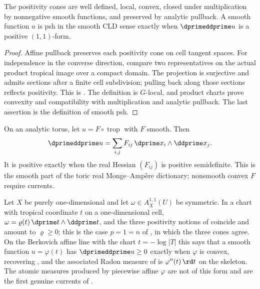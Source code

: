 \begin{proposition}
\label{prop:ch13-positivity-basic}
The positivity cones are well defined, local, convex, closed under
multiplication by nonnegative smooth functions, and preserved by analytic
pullback.  A smooth function $u$ is psh in the smooth CLD sense exactly when
$\dprimeddprime u$ is a positive $(1,1)$-form.
\end{proposition}
\begin{proof}
Affine pullback preserves each positivity cone on cell tangent spaces.
For independence in the converse direction, compare two representatives
on the actual product tropical image over a compact domain.  The
projection is surjective and admits sections after a finite cell
subdivision; pulling back along those sections reflects positivity.
This is \cite[Lemma~3.5.3]{CLD25}.  The definition is $G$-local,
and product charts prove convexity and compatibility with multiplication
and analytic pullback.  The last assertion is the definition of smooth psh.
\end{proof}

\begin{example}
\label{ex:ch13-toric-hessian}
On an analytic torus, let $u=F\circ\operatorname{trop}$ with $F$ smooth.
Then
\[
 \dprimeddprime u
 =\sum_{i,j}F_{ij}\,
      \dprime x_i\wedge\ddprime x_j.
\]
It is positive exactly when the real Hessian $(F_{ij})$ is positive
semidefinite.  This is the smooth part of the toric real
Monge--Amp\`ere dictionary; nonsmooth convex $F$ require currents.
\end{example}

\begin{example}
\label{ex:ch13-positivity-curve}
Let $X$ be purely one-dimensional and let $\omega\in A^{1,1}_X(U)$ be
symmetric.  In a chart with tropical coordinate $t$ on a one-dimensional
cell, $\omega=\varrho(t)\,\dprime t\wedge\ddprime t$, and the three
positivity notions of  coincide and amount to
$\varrho\ge0$; this is the case $p=1=n$ of
, in which the three cones agree.  On
the Berkovich affine line with the chart $t=-\log|T|$ this says that a smooth
function $u=\varphi(t)$ has $\dprimeddprime u\ge0$ exactly when $\varphi$ is
convex, recovering , and the associated Radon
measure of  is $\varphi''(t)\,\rd t$ on the skeleton.
The atomic measures produced by piecewise affine $\varphi$ are not of this
form and are the first genuine currents of .
\end{example}


